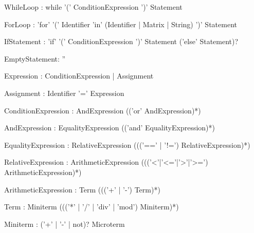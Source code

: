 \documentclass[12pt,a4paper]{article}
\begin{document}
\begin{rail}
WhileLoop : while '(' ConditionExpression ')' Statement
\end{rail}

\begin{rail}
ForLoop : 'for' '(' Identifier 'in' (Identifier | Matrix | String) ')' Statement
\end{rail}

\begin{rail}
IfStatement : 'if' '(' ConditionExpression ')' Statement ('else' Statement)?
\end{rail}

\begin{rail}
EmptyStatement: ''
\end{rail}

\begin{rail}
Expression : ConditionExpression | Assignment
\end{rail}

\begin{rail}
Assignment : Identifier '=' Expression
\end{rail}

\begin{rail}
ConditionExpression : AndExpression (('or'  AndExpression)*)
\end{rail}

\begin{rail}
AndExpression : EqualityExpression (('and'  EqualityExpression)*)
\end{rail}

\begin{rail}
EqualityExpression : RelativeExpression ((('==' | '!=') RelativeExpression)*)
\end{rail}

\begin{rail}
RelativeExpression : ArithmeticExpression ((('<'|'<='|'>'|'>=') ArithmeticExpression)*)
\end{rail}

\begin{rail}
ArithmeticExpression : Term ((('+' | '-') Term)*)
\end{rail}

\begin{rail}
Term : Miniterm ((('*' | '/' | 'div' | 'mod') Miniterm)*)
\end{rail}

\begin{rail}
Miniterm : ('+' | '-' | not)? Microterm
\end{rail}
\end{document}
